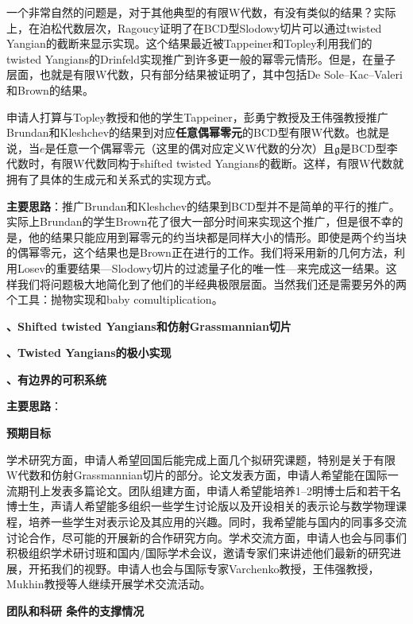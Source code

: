\documentclass[12pt,UTF8,AutoFakeBold=4,a4paper]{ctexart}
\begin{document}
一个非常自然的问题是，对于其他典型的有限W代数，有没有类似的结果？实际上，在泊松代数层次，Ragoucy证明了在BCD型Slodowy切片可以通过twisted Yangian的截断来显示实现。这个结果最近被Tappeiner和Topley利用我们的twisted Yangians的Drinfeld实现推广到许多更一般的幂零元情形。但是，在量子层面，也就是有限W代数，只有部分结果被证明了，其中包括De Sole–Kac–Valeri和Brown的结果。

申请人打算与Topley教授和他的学生Tappeiner，彭勇宁教授及王伟强教授推广Brundan和Kleshchev的结果到对应\textbf{任意偶幂零元}的BCD型有限W代数。也就是说，当$e$是任意一个偶幂零元（这里的偶对应定义W代数的分次）且$\mathfrak g$是BCD型李代数时，有限W代数同构于shifted twisted Yangians的截断。这样，有限W代数就拥有了具体的生成元和关系式的实现方式。

\textbf{主要思路}：推广Brundan和Kleshchev的结果到BCD型并不是简单的平行的推广。实际上Brundan的学生Brown花了很大一部分时间来实现这个推广，但是很不幸的是，他的结果只能应用到幂零元的约当块都是同样大小的情形。即使是两个约当块的偶幂零元，这个结果也是Brown正在进行的工作。我们将采用新的几何方法，利用Losev的重要结果---Slodowy切片的过滤量子化的唯一性---来完成这一结果。这样我们将问题极大地简化到了他们的半经典极限层面。当然我们还是需要另外的两个工具：抛物实现和baby comultiplication。

\medskip

\textbf{、Shifted twisted Yangians和仿射Grassmannian切片}

\medskip

\textbf{、Twisted Yangians的极小实现}

\medskip

\textbf{、有边界的可积系统}

\textbf{主要思路}：


\medskip

\textbf{\sihao 预期目标}

学术研究方面，申请人希望回国后能完成上面几个拟研究课题，特别是关于有限W代数和仿射Grassmannian切片的部分。论文发表方面，申请人希望能在国际一流期刊上发表多篇论文。团队组建方面，申请人希望能培养1--2明博士后和若干名博士生，声请人希望能多组织一些学生讨论版以及开设相关的表示论与数学物理课程，培养一些学生对表示论及其应用的兴趣。同时，我希望能与国内的同事多交流讨论合作，尽可能的开展新的合作研究方向。学术交流方面，申请人也会与同事们积极组织学术研讨班和国内/国际学术会议，邀请专家们来讲述他们最新的研究进展，开拓我们的视野。申请人也会与国际专家Varchenko教授，王伟强教授，Mukhin教授等人继续开展学术交流活动。

\medskip

\textbf{\sihao 团队和科研 条件的支撑情况}
\end{document}
